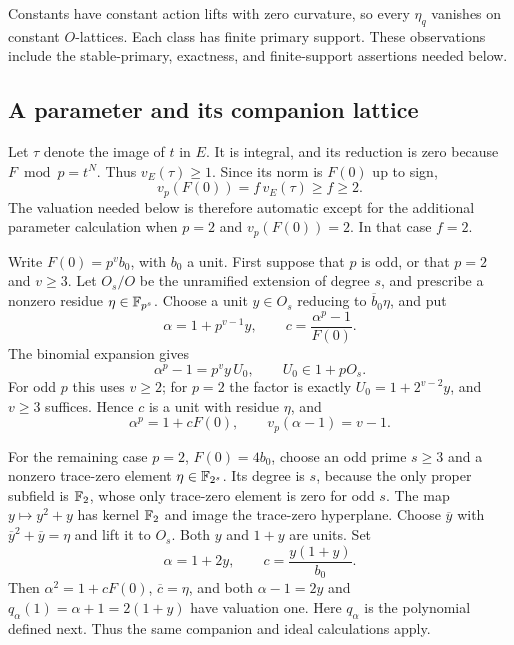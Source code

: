 Constants have constant action lifts with zero curvature, so every
$\eta_q$ vanishes on constant $O$-lattices.  Each class has finite
primary support.  These observations include the stable-primary,
exactness, and finite-support assertions needed below.

\subsection{A parameter and its companion lattice}

Let $\tau$ denote the image of $t$ in $E$.  It is integral, and its
reduction is zero because $F\bmod p=t^N$.  Thus $v_E(\tau)\ge1$.
Since its norm is $F(0)$ up to sign,
\[
 v_p(F(0))=f\,v_E(\tau)\ge f\ge2.
\]
The valuation needed below is therefore automatic except for the
additional parameter calculation when $p=2$ and $v_p(F(0))=2$.
In that case $f=2$.

Write $F(0)=p^v b_0$, with $b_0$ a unit.  First suppose that $p$ is
odd, or that $p=2$ and $v\ge3$.  Let $O_s/O$ be the
unramified extension of degree $s$, and prescribe a nonzero residue
$\eta\in\mathbb F_{p^s}$.  Choose a unit $y\in O_s$ reducing to
$\overline b_0\eta$, and put
\begin{equation}\label{eq:monogenic-parameter}
 \alpha=1+p^{v-1}y,\qquad c=\frac{\alpha^p-1}{F(0)}.
\end{equation}
The binomial expansion gives
\[
 \alpha^p-1=p^v y\,U_0,\qquad U_0\in1+pO_s.
\]
For odd $p$ this uses $v\ge2$; for $p=2$ the factor is exactly
$U_0=1+2^{v-2}y$, and $v\ge3$ suffices.  Hence $c$ is a unit
with residue $\eta$, and
\[
 \alpha^p=1+cF(0),\qquad v_p(\alpha-1)=v-1.
\]

For the remaining case $p=2$, $F(0)=4b_0$, choose an odd prime
$s\ge3$ and a nonzero trace-zero element $\eta\in\mathbb F_{2^s}$.
Its degree is $s$, because the only proper subfield is $\mathbb F_2$,
whose only trace-zero element is zero for odd $s$.
The map $y\mapsto y^2+y$ has kernel $\mathbb F_2$ and image the
trace-zero hyperplane.  Choose $\overline y$ with
$\overline y^2+\overline y=\eta$ and lift it to $O_s$.
Both $y$ and $1+y$ are units.  Set
\[
 \alpha=1+2y,\qquad c=\frac{y(1+y)}{b_0}.
\]
Then $\alpha^2=1+cF(0)$, $\overline c=\eta$, and both
$\alpha-1=2y$ and $q_\alpha(1)=\alpha+1=2(1+y)$ have
valuation one.  Here $q_\alpha$ is the polynomial defined next.
Thus the same companion and ideal calculations apply.

